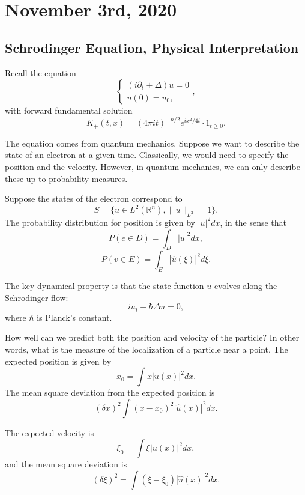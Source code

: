 \documentclass[12pt]{scrartcl}
\newcommand{\R}{\mathbb{R}}
\renewcommand{\hat}{\widehat}
\begin{document}
\section{November 3rd, 2020}
\subsection{Schrodinger Equation, Physical Interpretation}
Recall the equation
$$\begin{cases}
(i \partial_t + \Delta) u = 0 \\
u(0) = u_0,
\end{cases},$$
with forward fundamental solution 
$$K_+(t, x) = (4 \pi i t)^{-n/2} e^{ix^2/4t} \cdot 1_{t \ge 0}.$$

The equation comes from quantum mechanics.  Suppose we want to describe the state of an electron at a given time.  Classically, we would need to specify the position and the velocity.  However, in quantum mechanics, we can only describe these up to probability measures.

Suppose the states of the electron correspond to $$S = \{u \in L^2(\R^n), \|u\|_{L^2} = 1\}.$$
The probability distribution for position is given by $|u|^2dx$, in the sense that 
$$P(e \in D) = \int_D |u|^2 dx,$$
$$P(v \in E) = \int_E |\hat{u}(\xi)|^2d\xi.$$

The key dynamical property is that the state function $u$ evolves along the Schrodinger flow:
$$iu_t + \hbar \Delta u = 0,$$
where $\hbar$ is Planck's constant.

How well can we predict both the position and velocity of the particle?  In other words, what is the measure of the localization of a particle near a point.  The expected position is given by 
$$x_0 = \int x |u(x)|^2 dx.$$
The mean square deviation from the expected position is 
$$(\delta x)^2\int (x - x_0)^2 |\hat{u}(x)|^2 dx.$$

The expected velocity is 
$$\xi_0 = \int \xi |u(x)|^2 dx,$$
and the mean square deviation is 
$$(\delta \xi)^2 = \int (\xi - \xi_0) |\hat{u}(x)|^2 dx.$$
\end{document}
